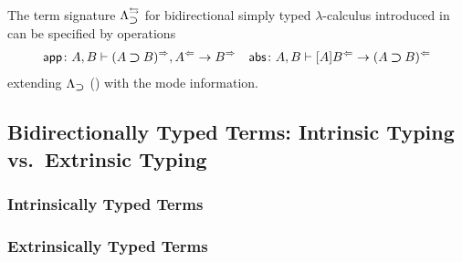 \documentclass[acmsmall,screen]{acmart}
\theoremstyle{acmdefinition}
\begin{document}
\begin{example}
  The term signature $\Lambda_{\mathbin{\bm{\supset}}}^{\leftrightarrows}$ for bidirectional simply typed $\lambda$-calculus introduced in  can be specified by operations 
  \begin{align*}
    \mathsf{app}\colon A, B \vdash (A \mathbin{\bm{\supset}} B)^{\Rightarrow}, A^{\Leftarrow} \to B^{\Rightarrow} &&
    \mathsf{abs}\colon A , B \vdash [A]B^{\Leftarrow} \to (A \mathbin{\bm{\supset}} B)^{\Leftarrow}
  \end{align*}
  extending $\Lambda_{\mathbin{\bm{\supset}}}$ () with the mode information.
\end{example}

\subsection{Bidirectionally Typed Terms: Intrinsic Typing vs.\ Extrinsic Typing}

\subsubsection{Intrinsically Typed Terms}



\subsubsection{Extrinsically Typed Terms}
\end{document}

